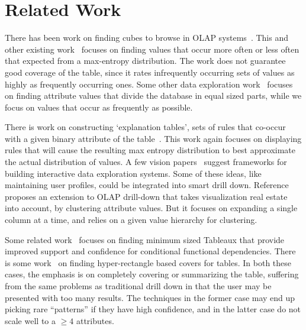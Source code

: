 \documentclass[10pt,journal,compsoc]{IEEEtran}
\newcounter{prob}
\begin{document}
\section{Related Work}\label{sec:related}

There has been work on finding cubes to browse in OLAP systems~\cite{Sarawagi:2001:UMA:767141.767148, Sarawagi00user-adaptiveexploration, Sarawagi98discovery-drivenexploration}. This and other existing work~\cite{Mampaey:2011:TMI:2020408.2020499} focuses on finding values that occur more often or less often that expected from a max-entropy distribution. The work does not guarantee good coverage of the table, since it rates infrequently occurring sets of values as highly as frequently occurring ones. Some other data exploration work~\cite{sellam:meet} focuses on finding attribute values that divide the database in equal sized parts, while we focus on values that occur as frequently as possible. 

There is work on constructing `explanation tables', sets of rules that co-occur with a given binary attribute of the table~\cite{DBLP:journals/pvldb/GebalyAGKS14}. This work again focuses on displaying rules that will cause the resulting max entropy distribution to best approximate the actual distribution of values. A few vision papers~\cite{data-deluge, cetintemel2013query} suggest frameworks for building interactive data exploration systems. Some of these ideas, like maintaining user profiles, could be integrated into smart drill down. Reference~\cite{DBLP:conf/edbt/CandanCQS09} proposes an extension to OLAP drill-down that takes visualization real estate into account, by clustering attribute values. But it focuses on expanding a single column at a time, and relies on a given value hierarchy for clustering.

Some related work~\cite{DBLP:journals/debu/GolabKS11, Golab:2008:GNT:1453856.1453900} focuses on finding minimum sized Tableaux that provide improved support and confidence for conditional functional dependencies. There is some work~\cite{Bu:2005:MSH:1083592.1083644, Lakshmanan:2002:GMA:1287369.1287435, DBLP:conf:kdd:XiangJFD08, Geerts04tilingdatabases} on finding hyper-rectangle based covers for tables. In both these cases, the emphasis is on completely covering or 
summarizing the table, suffering from the same problems as traditional drill down in that the user may be presented with
too many results. The techniques in the former case may end up picking rare ``patterns'' if they have high confidence, and in the latter case do not scale well to a $\geq 4$ attributes. 
\end{document}
